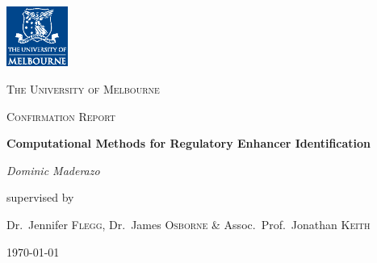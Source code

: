 \documentclass[12pt,a4paper]{article}
\author{D Maderazo}
\begin{document}
\begin{titlepage}
	\centering
	\includegraphics[width=0.15\textwidth]{PRIMARY_A_Vertical_Housed_CMYK.eps}\par\vspace{1cm}
	{\scshape\LARGE The University of Melbourne \par}
	\vspace{1cm}
	{\scshape\Large Confirmation Report\par}
	\vspace{1.5cm}
	{\huge\bfseries Computational Methods for Regulatory Enhancer Identification\par}
	\vspace{2cm}
	{\Large\itshape Dominic Maderazo\par}
	
	\vfill
	supervised by\par
	Dr.~Jennifer \textsc{Flegg}, Dr.~James \textsc{Osborne} \& Assoc.~Prof.~Jonathan \textsc{Keith}

	\vfill

	{\large \today\par}
\end{titlepage}
    
\end{document}
